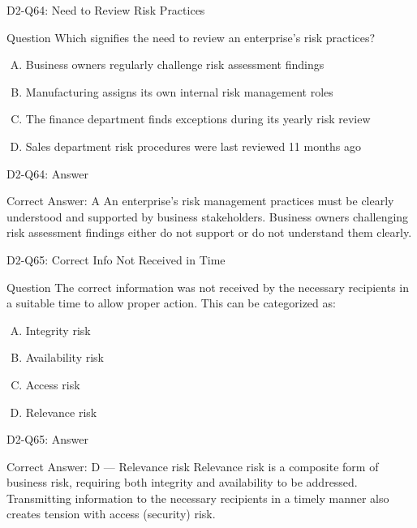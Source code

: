 \documentclass{beamer}
\begin{document}
	\begin{frame}{D2-Q64: Need to Review Risk Practices}
		\begin{block}{Question}
			Which signifies the need to review an enterprise's risk practices?
		\end{block}
		\begin{enumerate}[(A)]
			\item Business owners regularly challenge risk assessment findings
			\item Manufacturing assigns its own internal risk management roles
			\item The finance department finds exceptions during its yearly risk review
			\item Sales department risk procedures were last reviewed 11 months ago
		\end{enumerate}
	\end{frame}
	\begin{frame}{D2-Q64: Answer}
		\begin{block}{Correct Answer: A}
			An enterprise's risk management practices must be clearly understood and supported by business stakeholders. Business owners challenging risk assessment findings either do not support or do not understand them clearly.
		\end{block}
	\end{frame}
	
	\begin{frame}{D2-Q65: Correct Info Not Received in Time}
		\begin{block}{Question}
			The correct information was not received by the necessary recipients in a suitable time to allow proper action. This can be categorized as:
		\end{block}
		\begin{enumerate}[(A)]
			\item Integrity risk
			\item Availability risk
			\item Access risk
			\item Relevance risk
		\end{enumerate}
	\end{frame}
	\begin{frame}{D2-Q65: Answer}
		\begin{block}{Correct Answer: D --- Relevance risk}
			Relevance risk is a composite form of business risk, requiring both integrity and availability to be addressed. Transmitting information to the necessary recipients in a timely manner also creates tension with access (security) risk.
		\end{block}
	\end{frame}
	
\end{document}
